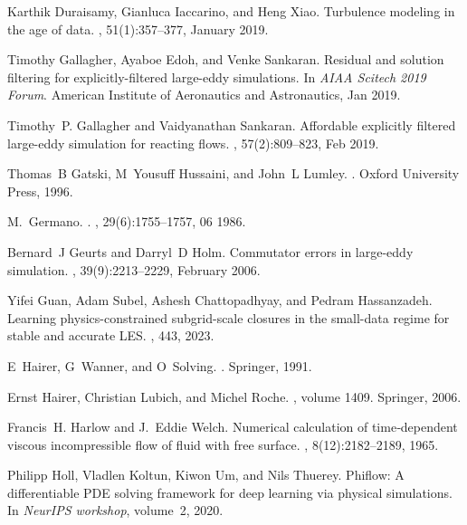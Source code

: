 \documentclass[preprint]{elsarticle}
\begin{document}
\begin{thebibliography}{10}
Karthik Duraisamy, Gianluca Iaccarino, and Heng Xiao.
\newblock Turbulence modeling in the age of data.
, 51(1):357–377, January 2019.

Timothy Gallagher, Ayaboe Edoh, and Venke Sankaran.
\newblock Residual and solution filtering for explicitly-filtered large-eddy simulations.
\newblock In {\em AIAA Scitech 2019 Forum}. American Institute of Aeronautics and Astronautics, Jan 2019.

Timothy~P. Gallagher and Vaidyanathan Sankaran.
\newblock Affordable explicitly filtered large-eddy simulation for reacting flows.
, 57(2):809–823, Feb 2019.

Thomas~B Gatski, M~Yousuff Hussaini, and John~L Lumley.
.
\newblock Oxford University Press, 1996.

M.~Germano.
.
, 29(6):1755--1757, 06 1986.

Bernard~J Geurts and Darryl~D Holm.
\newblock Commutator errors in large-eddy simulation.
, 39(9):2213–2229, February 2006.

Yifei Guan, Adam Subel, Ashesh Chattopadhyay, and Pedram Hassanzadeh.
\newblock Learning physics-constrained subgrid-scale closures in the small-data regime for stable and accurate {{LES}}.
, 443, 2023.

E~Hairer, G~Wanner, and O~Solving.
.
\newblock Springer, 1991.

Ernst Hairer, Christian Lubich, and Michel Roche.
, volume 1409.
\newblock Springer, 2006.

Francis~H. Harlow and J.~Eddie Welch.
\newblock Numerical calculation of time‐dependent viscous incompressible flow of fluid with free surface.
, 8(12):2182--2189, 1965.

Philipp Holl, Vladlen Koltun, Kiwon Um, and Nils Thuerey.
\newblock Phiflow: A differentiable {PDE} solving framework for deep learning via physical simulations.
\newblock In {\em NeurIPS workshop}, volume~2, 2020.


\end{thebibliography}
\end{document}

